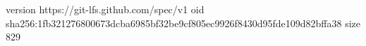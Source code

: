 version https://git-lfs.github.com/spec/v1
oid sha256:1fb321276800673dcba6985bf32be9cf805ec9926f8430d95fde109d82bffa38
size 829
